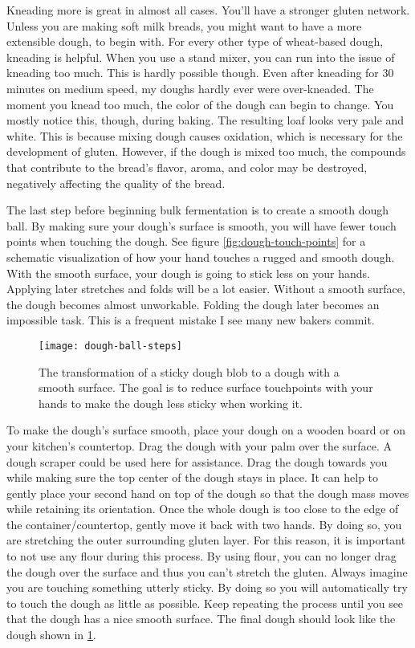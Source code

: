 Kneading more is great in almost all cases. You'll have a stronger
gluten network. Unless you are making soft milk breads, you
might want to have a more extensible dough, to begin with. For every
other type of wheat-based dough, kneading is helpful. When you use
a stand mixer, you can run into the issue of kneading too much. This
is hardly possible though. Even after kneading for 30 minutes on medium
speed, my doughs hardly ever were over-kneaded. The moment you knead
too much, the color of the dough can begin to change. You mostly
notice this, though, during baking. The resulting loaf looks very
pale and white. This is because mixing dough causes oxidation,
which is necessary for the development of gluten.
However, if the dough is mixed too much, the compounds that contribute
to the bread's flavor, aroma, and color may be destroyed, negatively
affecting the quality of the bread.\cite{oxidization+dough}

The last step before beginning bulk fermentation is to
create a smooth dough ball. By making sure your dough's surface is
smooth, you will have fewer touch points when touching the dough.
See figure \ref{fig:dough-touch-points} for a schematic visualization
of how your hand touches a rugged and smooth dough.
With the smooth surface, your dough is going to stick less on your hands. Applying
later stretches and folds will be a lot easier. Without a smooth
surface, the dough becomes almost unworkable. Folding the dough later
becomes an impossible task. This is a frequent mistake I see many
new bakers commit.

\begin{figure}[!htb]
  \texttt{[image: dough-ball-steps]}
  \caption{The transformation of a sticky dough blob to a dough
  with a smooth surface. The goal is to reduce surface touchpoints
  with your hands to make the dough less sticky when working it.
  }
  \label{fig:dough-ball-steps}
\end{figure}

To make the dough's surface smooth, place your dough on a wooden board or
on your kitchen's countertop. Drag the dough with your palm over the surface.
A dough scraper could be used here for assistance.
Drag the dough towards you while making sure the top center of the dough stays in place.
It can help to gently place your second hand on top of the dough so that
the dough mass moves while retaining its orientation. Once the whole dough
is too close to the edge of the container/countertop, gently move it back
with two hands. By doing so, you are stretching the outer surrounding gluten layer.
For this reason, it is important to not use any flour during this process.
By using flour, you can no longer drag the dough over the surface and thus
you can't stretch the gluten. Always imagine you are touching something utterly sticky.
By doing so you will automatically try to touch the dough as little
as possible. Keep repeating the process until you see that the dough
has a nice smooth surface. The final dough should look like the dough
shown in \ref{fig:dough-ball-steps}.

